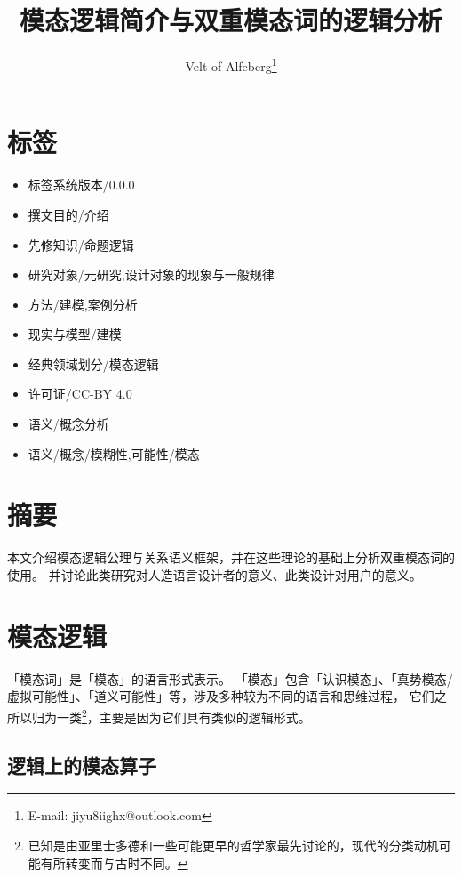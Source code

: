 \documentclass[fontset=ubuntu]{ctexart}
\begin{document}
	\title{模态逻辑简介与双重模态词的逻辑分析}
	\author{Velt of Alfeberg\footnote{E-mail: jiyu8iighx@outlook.com}}

	\maketitle
	
	\section*{标签}
		\begin{multicols}{2}
			\begin{itemize}
				\item 标签系统版本/0.0.0
				\item 撰文目的/介绍
				\item 先修知识/命题逻辑
				\item 研究对象/元研究,设计对象的现象与一般规律
				\item 方法/建模,案例分析
				\item 现实与模型/建模
				\item 经典领域划分/模态逻辑
				\item 许可证/CC-BY 4.0
				\item 语义/概念分析
				\item 语义/概念/模糊性,可能性/模态
			\end{itemize}
		\end{multicols}
	\section*{摘要}
		本文介绍模态逻辑公理与关系语义框架，并在这些理论的基础上分析双重模态词的使用。
		并讨论此类研究对人造语言设计者的意义、此类设计对用户的意义。


	\section{模态逻辑}

		「模态词」是「模态」的语言形式表示。
		「模态」包含「认识模态」、「真势模态/虚拟可能性」、「道义可能性」等，涉及多种较为不同的语言和思维过程，
		它们之所以归为一类\footnote{已知是由亚里士多德和一些可能更早的哲学家最先讨论的，现代的分类动机可能有所转变而与古时不同。}，主要是因为它们具有类似的逻辑形式。

		\subsection{逻辑上的模态算子}
\end{document}
